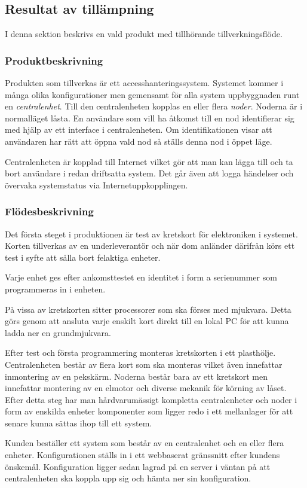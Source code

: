 \documentclass{article}
\begin{document}
\subsection*{Resultat av tillämpning}
I denna sektion beskrivs en vald produkt med tillhörande tillverkningsflöde.
\subsubsection*{Produktbeskrivning}
Produkten som tillverkas är ett accesshanteringssystem. Systemet kommer i många olika konfigurationer men gemensamt för alla system uppbyggnaden runt en \emph{centralenhet}. Till den centralenheten kopplas en eller flera \emph{noder}. Noderna är i normalläget låsta. En användare som vill ha åtkomst till en nod identifierar sig med hjälp av ett interface i centralenheten. Om identifikationen visar att användaren har rätt att öppna vald nod så ställs denna nod i öppet läge.

Centralenheten är kopplad till Internet vilket gör att man kan lägga till och ta bort användare i redan driftsatta system. Det går även att logga händelser och övervaka systemstatus via Internetuppkopplingen.
     
\subsubsection*{Flödesbeskrivning}
Det första steget i produktionen är test av kretskort för elektroniken i systemet. Korten tillverkas av en underleverantör och när dom anländer därifrån körs ett test i syfte att sålla bort felaktiga enheter.

Varje enhet ges efter ankomsttestet en identitet i form a serienummer som programmeras in i enheten.

På vissa av kretskorten sitter processorer som ska förses med mjukvara. Detta görs genom att ansluta varje enskilt kort direkt till en lokal PC för att kunna ladda ner en grundmjukvara. 
 
Efter test och första programmering monteras kretskorten i ett plasthölje. Centralenheten består av flera kort som ska monteras vilket även innefattar inmontering av en pekskärm. Noderna består bara av ett kretskort men innefattar montering av en elmotor och diverse mekanik för körning av låset. Efter detta steg har man hårdvarumässigt kompletta centralenheter och   noder i form av enskilda enheter komponenter som ligger redo i ett mellanlager för att senare kunna sättas ihop till ett system.

Kunden beställer ett system som består av en centralenhet och en eller flera enheter. Konfigurationen ställs in i ett webbaserat gränssnitt efter kundens önskemål. Konfiguration ligger sedan lagrad på en server i väntan på att centralenheten ska koppla upp sig och hämta ner sin konfiguration.
\end{document}
